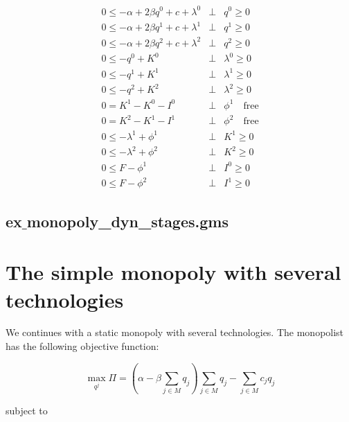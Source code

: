 \documentclass[11pt,a4paper]{article}
\begin{document}
\begin{eqnarray*}
	0 \leq -\alpha + 2\beta q^0 + c + \lambda^0 &\bot& q^0 \geq 0\\
        0 \leq -\alpha + 2\beta q^1 + c + \lambda^1 &\bot& q^1 \geq 0\\
        0 \leq -\alpha + 2\beta q^2 + c + \lambda^2 &\bot& q^2 \geq 0\\
	0 \leq -q^0 + K^0 &\bot& \lambda^0 \geq 0 \\
        0 \leq -q^1 + K^1 &\bot& \lambda^1 \geq 0 \\
        0 \leq -q^2 + K^2 &\bot& \lambda^2 \geq 0 \\
        0 = K^1 - K^0 - I^0 &\bot& \phi^1 \quad \mbox{free} \\
        0 = K^2 - K^1 - I^1 &\bot& \phi^2 \quad \mbox{free} \\
        0 \leq -\lambda^1 + \phi^1 &\bot& K^1 \geq 0 \\
        0 \leq -\lambda^2 + \phi^2 &\bot& K^2 \geq 0 \\
        0 \leq F - \phi^1 &\bot& I^0 \geq 0 \\
        0 \leq F - \phi^2 &\bot& I^1 \geq 0 
\end{eqnarray*}


\subsection*{ex$\_$monopoly\_dyn\_stages.gms}




%


\section{The simple monopoly with several technologies}

We continues with a static monopoly with several technologies. The monopolist has the following objective function:

\begin{equation*}
	\max_{q^j}\Pi = (\alpha-\beta \sum_{j\in M}q_j)\sum_{j\in M}q_j - \sum_{j\in M}c_jq_j 
\end{equation*}

subject to
\end{document}
